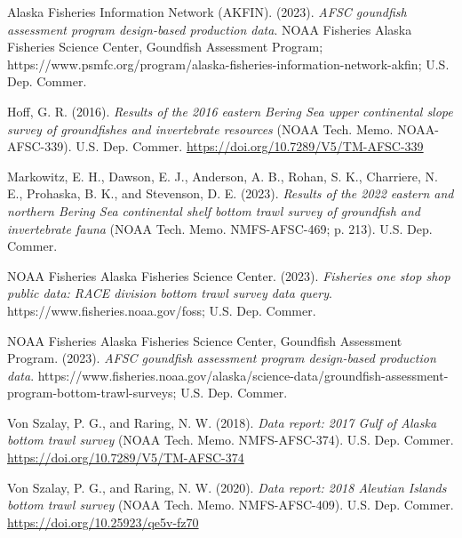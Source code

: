 \documentclass[
  letterpaper,
  oneside,
  open=any]{scrbook}
\newlength{\cslhangindent}
\newlength{\cslentryspacingunit} %
\newenvironment{CSLReferences}[2] %
 {%
  \setlength{\parindent}{0pt}
  \ifodd #1
  \let\oldpar\par
  \def\par{\hangindent=\cslhangindent\oldpar}
  \fi
  \setlength{\parskip}{#2\cslentryspacingunit}
 }%
 {}
\begin{document}
\hypertarget{refs}{}
\begin{CSLReferences}{1}{0}
\leavevmode{}%
Alaska Fisheries Information Network (AKFIN). (2023). \emph{AFSC
goundfish assessment program design-based production data}. {NOAA
Fisheries Alaska Fisheries Science Center, Goundfish Assessment
Program};
https://www.psmfc.org/program/alaska-fisheries-information-network-akfin;
{U.S. Dep. Commer.}

\leavevmode{}%
Hoff, G. R. (2016). \emph{Results of the 2016 eastern {Bering Sea} upper
continental slope survey of groundfishes and invertebrate resources}
(NOAA Tech. Memo. NOAA-AFSC-339). {U.S. Dep. Commer.}
\url{https://doi.org/10.7289/V5/TM-AFSC-339}

\leavevmode{}%
Markowitz, E. H., Dawson, E. J., Anderson, A. B., Rohan, S. K.,
Charriere, N. E., Prohaska, B. K., and Stevenson, D. E. (2023).
\emph{Results of the 2022 eastern and northern {Bering Sea} continental
shelf bottom trawl survey of groundfish and invertebrate fauna} (NOAA
Tech. Memo. NMFS-AFSC-469; p. 213). {U.S. Dep. Commer.}

\leavevmode{}%
NOAA Fisheries Alaska Fisheries Science Center. (2023). \emph{Fisheries
one stop shop public data: RACE division bottom trawl survey data
query}. https://www.fisheries.noaa.gov/foss; {U.S. Dep. Commer.}

\leavevmode{}%
NOAA Fisheries Alaska Fisheries Science Center, Goundfish Assessment
Program. (2023). \emph{AFSC goundfish assessment program design-based
production data}.
https://www.fisheries.noaa.gov/alaska/science-data/groundfish-assessment-program-bottom-trawl-surveys;
{U.S. Dep. Commer.}

\leavevmode{}%
Von Szalay, P. G., and Raring, N. W. (2018). \emph{Data report: 2017
{Gulf of Alaska} bottom trawl survey} (NOAA Tech. Memo. NMFS-AFSC-374).
{U.S. Dep. Commer.} \url{https://doi.org/10.7289/V5/TM-AFSC-374}

\leavevmode{}%
Von Szalay, P. G., and Raring, N. W. (2020). \emph{Data report: 2018
{Aleutian Islands} bottom trawl survey} (NOAA Tech. Memo.
NMFS-AFSC-409). {U.S. Dep. Commer.}
\url{https://doi.org/10.25923/qe5v-fz70}

\end{CSLReferences}
\end{document}
